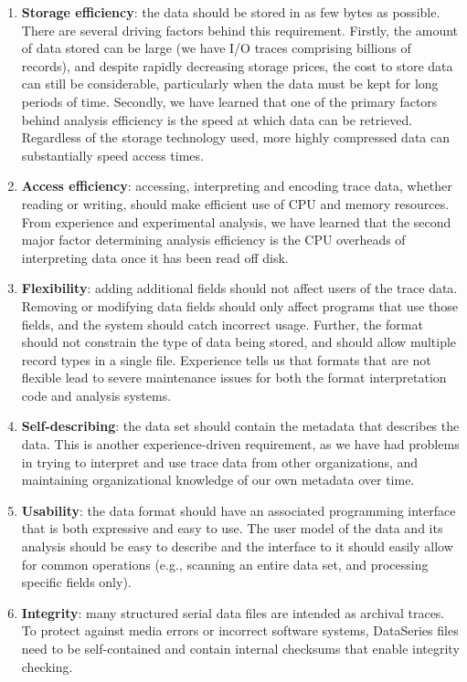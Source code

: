 \documentclass{acm_proc_article-sp}
\begin{document}
\begin{enumerate}

\item \textbf{Storage efficiency}: the data should be stored in as few
bytes as possible. There are several driving factors behind this
requirement. Firstly, the amount of data stored can be large (we have
I/O traces comprising billions of records), and despite rapidly
decreasing storage prices, the cost to store data can still be
considerable, particularly when the data must be kept for long periods
of time. Secondly, we have learned that one of the primary factors
behind analysis efficiency is the speed at which data can be
retrieved. Regardless of the storage technology used, more highly
compressed data can substantially speed access times.

\item \textbf{Access efficiency}: accessing, interpreting and encoding
trace data, whether reading or writing, should make efficient use of
CPU and memory resources. From experience and experimental analysis,
we have learned that the second major factor determining analysis
efficiency is the CPU overheads of interpreting data once it has been
read off disk.

\item \textbf{Flexibility}: adding additional fields should not affect
users of the trace data.  Removing or modifying data fields should
only affect programs that use those fields, and the system should
catch incorrect usage.  Further, the format should not constrain
the type of data being stored, and should allow multiple record types
in a single file. 
Experience 
tells us that formats that
are not flexible lead to severe maintenance issues for both the format
interpretation code and analysis systems.

\item \textbf{Self-describing}: the data set should contain the
metadata that describes the data. This is another experience-driven
requirement, as we have had problems in trying to interpret and use
trace data from other organizations, and maintaining organizational
knowledge of our own metadata over time.

\item \textbf{Usability}: the data format should have an
associated programming interface that is both expressive and easy to
use. 
The user model of the data and its analysis should
be easy to describe and the interface to it should easily allow for
common operations (e.g., scanning an entire data set, and processing
specific fields only).

\item \textbf{Integrity}: many structured serial data files are 
intended as archival traces. To protect against media
errors or incorrect software systems, DataSeries files need to be
self-contained and contain internal checksums that enable
integrity checking.

\end{enumerate}
\end{document}
